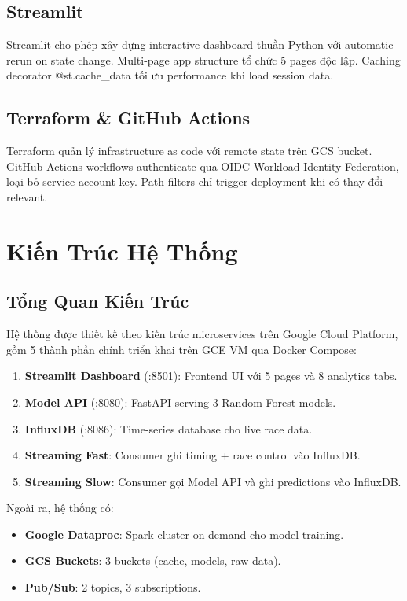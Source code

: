 \documentclass[conference,10pt]{IEEEtran}
\begin{document}
\subsection{Streamlit}
Streamlit cho phép xây dựng interactive dashboard thuần Python với automatic rerun on state change. Multi-page app structure tổ chức 5 pages độc lập. Caching decorator @st.cache\_data tối ưu performance khi load session data.

\subsection{Terraform \& GitHub Actions}
Terraform quản lý infrastructure as code với remote state trên GCS bucket. GitHub Actions workflows authenticate qua OIDC Workload Identity Federation, loại bỏ service account key. Path filters chỉ trigger deployment khi có thay đổi relevant.

\section{Kiến Trúc Hệ Thống}

\subsection{Tổng Quan Kiến Trúc}

Hệ thống được thiết kế theo kiến trúc microservices trên Google Cloud Platform, gồm 5 thành phần chính triển khai trên GCE VM qua Docker Compose:

\begin{enumerate}
    \item \textbf{Streamlit Dashboard} (:8501): Frontend UI với 5 pages và 8 analytics tabs.
    \item \textbf{Model API} (:8080): FastAPI serving 3 Random Forest models.
    \item \textbf{InfluxDB} (:8086): Time-series database cho live race data.
    \item \textbf{Streaming Fast}: Consumer ghi timing + race control vào InfluxDB.
    \item \textbf{Streaming Slow}: Consumer gọi Model API và ghi predictions vào InfluxDB.
\end{enumerate}

Ngoài ra, hệ thống có:
\begin{itemize}
    \item \textbf{Google Dataproc}: Spark cluster on-demand cho model training.
    \item \textbf{GCS Buckets}: 3 buckets (cache, models, raw data).
    \item \textbf{Pub/Sub}: 2 topics, 3 subscriptions.
\end{itemize}
\end{document}
